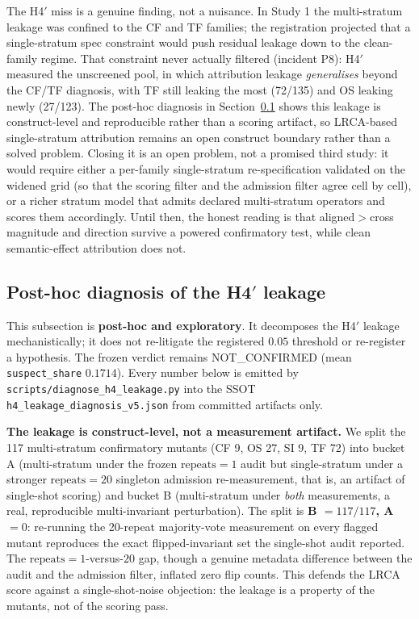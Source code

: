 \documentclass[manuscript,screen,review]{acmart}
\begin{document}
The H4\('\) miss is a genuine finding, not a nuisance. In Study 1 the
multi-stratum leakage was confined to the CF and TF families; the
registration projected that a single-stratum spec constraint would push
residual leakage down to the clean-family regime. That constraint never
actually filtered (incident P8): H4\('\) measured the unscreened pool, in
which attribution leakage \emph{generalises} beyond the CF/TF diagnosis,
with TF still leaking the most (72/135) and OS leaking newly (27/123). The
post-hoc diagnosis in Section~\ref{study2-h4-diagnosis} shows this leakage is
construct-level and reproducible rather than a scoring artifact, so
LRCA-based single-stratum attribution remains an
open construct boundary rather than a solved problem. Closing it is an
open problem, not a promised third study: it would require either a
per-family single-stratum re-specification validated on the widened grid
(so that the scoring filter and the admission filter agree cell by cell),
or a richer stratum model that admits declared multi-stratum operators
and scores them accordingly. Until then, the honest reading is that
aligned\(>\)cross magnitude and direction survive a powered confirmatory
test, while clean semantic-effect attribution does not.

\subsection{Post-hoc diagnosis of the H4\('\) leakage}\label{study2-h4-diagnosis}

This subsection is \textbf{post-hoc and exploratory}. It decomposes the
H4\('\) leakage mechanistically; it does not re-litigate the registered
\(0.05\) threshold or re-register a hypothesis. The frozen verdict remains
NOT\_CONFIRMED (mean \texttt{suspect\_share} \(0.1714\)). Every number below
is emitted by \texttt{scripts/diagnose\_h4\_leakage.py} into the SSOT
\texttt{h4\_leakage\_diagnosis\_v5.json} from committed artifacts only.

\textbf{The leakage is construct-level, not a measurement artifact.} We split
the 117 multi-stratum confirmatory mutants (CF 9, OS 27, SI 9, TF 72) into
bucket A (multi-stratum under the frozen \(\mathrm{repeats}=1\) audit but
single-stratum under a stronger \(\mathrm{repeats}=20\) singleton admission
re-measurement, that is, an artifact of single-shot scoring) and bucket B
(multi-stratum under \emph{both} measurements, a real, reproducible
multi-invariant perturbation). The split is \textbf{B \(=117/117\), A \(=0\)}:
re-running the 20-repeat majority-vote measurement on every flagged mutant
reproduces the exact flipped-invariant set the single-shot audit reported.
The \(\mathrm{repeats}=1\)-versus-\(20\) gap, though a genuine metadata
difference between the audit and the admission filter, inflated zero flip
counts. This defends the LRCA score against a single-shot-noise objection:
the leakage is a property of the mutants, not of the scoring pass.
\end{document}
